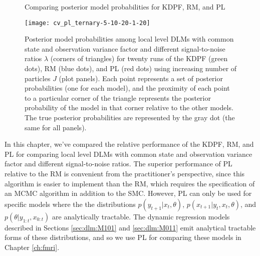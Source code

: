 \begin{figure}[ht]
\ssp
\centering
\caption{Comparing posterior model probabilities for KDPF, RM, and PL} \label{fig:comp:post}
\texttt{[image: cv\_pl\_ternary-5-10-20-1-20]}
\caption*{Posterior model probabilities among local level DLMs with common state and observation variance factor and different signal-to-noise ratios $\lambda$ (corners of triangles) for twenty runs of the KDPF (green dots), RM (blue dots), and PL (red dots) using increasing number of particles $J$ (plot panels). Each point represents a set of posterior probabilities (one for each model), and the proximity of each point to a particular corner of the triangle represents the posterior probability of the model in that corner relative to the other models. The true posterior probabilities are represented by the gray dot (the same for all panels).}
\end{figure}

In this chapter, we've compared the relative performance of the KDPF, RM, and PL for comparing local level DLMs with common state and observation variance factor and different signal-to-noise ratios. The superior performance of PL relative to the RM is convenient from the practitioner's perspective, since this algorithm is easier to implement than the RM, which requires the specification of an MCMC algorithm in addition to the SMC. However, PL can only be used for specific models where the the distributions $p(y_{t+1}|x_t,\theta)$, $p(x_{t+1}|y_t,x_t,\theta)$, and $p(\theta|y_{1:t},x_{0:t})$ are analytically tractable. The dynamic regression models described in Sections \ref{sec:dlm:M101} and \ref{sec:dlm:M011} emit analytical tractable forms of these distributions, and so we use PL for comparing these models in Chapter \ref{ch:fmri}.
